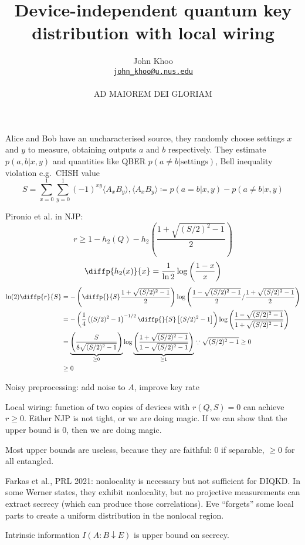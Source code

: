 \documentclass[10pt, a4paper]{article}
\title{Device-independent quantum key distribution with local wiring}
\author{John Khoo\\ \href{mailto:john_khoo@u.nus.edu}{\texttt{john\_khoo@u.nus.edu}} \\\\ AD MAIOREM DEI GLORIAM}
\newcommand{\?}{\mathrel{?}} %
\numberwithin{equation}{section} %
\theoremstyle{definition}
\theoremstyle{plain}
\theoremstyle{plain}
\begin{document}
  \maketitle

  Alice and Bob have an uncharacterised source, they randomly choose settings \(x\) and \(y\) to measure, obtaining outputs \(a\) and \(b\) respectively. They estimate \(p(a,b|x,y)\) and quantities like QBER \(p(a \neq b|\text{settings})\), Bell inequality violation e.g.\ CHSH value
  \[ S = \sum_{x=0}^1 \sum_{y=0}^1 {(-1)}^{xy} \langle A_x B_y \rangle, \langle A_x B_y \rangle \coloneqq p(a=b|x,y) - p(a\neq b|x,y) \]

  Pironio et al. in NJP:
  \[ r \geq 1 - h_2(Q) - h_2\left( \frac{1 + \sqrt{(S/2)^2-1}}{2} \right) \]
  \[ \diffp{{h_2(x)}}{x} = \frac{1}{\ln 2} \log \left(\frac{1-x}{x}\right) \]
  \begin{align*}
    \ln (2) \diffp{r}{S} &= - \left( \diffp{}{S} \frac{1 + \sqrt{(S/2)^2-1}}{2} \right) \log \left( \frac{1 - \sqrt{(S/2)^2-1}}{2} / \frac{1 + \sqrt{(S/2)^2-1}}{2} \right) \\
                 &= - \left( \frac{1}{4} \left( (S/2)^2-1 \right)^{-1/2} \diffp{}{S} \left[ (S/2)^2-1 \right] \right) \log \left( \frac{1 - \sqrt{(S/2)^2-1}}{1 + \sqrt{(S/2)^2-1}} \right) \\
                 &= \underbrace{\left( \frac{S}{ 8\sqrt{(S/2)^2-1} } \right)}_{\geq 0} \log \underbrace{ \left( \frac{1 + \sqrt{(S/2)^2-1}}{1 - \sqrt{(S/2)^2-1}} \right) }_{\geq 1} \because \sqrt{(S/2)^2-1} \geq 0 \\
                 &\geq 0
  \end{align*}

  Noisy preprocessing: add noise to \(A\), improve key rate

  Local wiring: function of two copies of devices with \(r(Q, S) = 0\) can achieve \(r \geq 0\). Either NJP is not tight, or we are doing magic. If we can show that the upper bound is 0, then we are doing magic.

  Most upper bounds are useless, because they are faithful: 0 if separable, \(\geq 0\) for all entangled.

  Farkas et al., PRL 2021: nonlocality is necessary but not sufficient for DIQKD\@. In some Werner states, they exhibit nonlocality, but no projective measurements can extract secrecy (which can produce those correlations). Eve ``forgets'' some local parts to create a uniform distribution in the nonlocal region.

  Intrinsic information \(I(A:B \downarrow E)\) is upper bound on secrecy.
\end{document}
